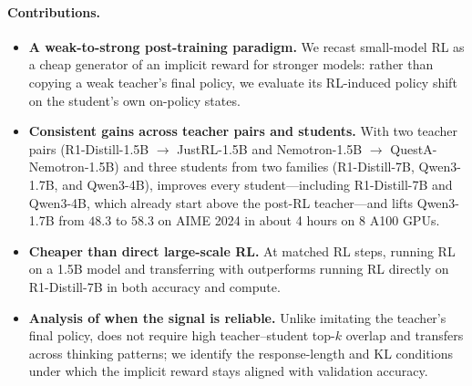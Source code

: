 \paragraph{Contributions.}
\begin{itemize}
    \item \textbf{A weak-to-strong post-training paradigm.} We recast small-model RL as a cheap generator of an implicit reward for stronger models: rather than copying a weak teacher's final policy, we evaluate its RL-induced policy shift on the student's own on-policy states.
    \item \textbf{Consistent gains across teacher pairs and students.} With
    two teacher pairs (R1-Distill-1.5B $\rightarrow$ JustRL-1.5B and
    Nemotron-1.5B $\rightarrow$ QuestA-Nemotron-1.5B) and three students from
    two families (R1-Distill-7B, Qwen3-1.7B, and Qwen3-4B), \method{} improves every
    student---including R1-Distill-7B and Qwen3-4B, which already start above the
    post-RL teacher---and lifts Qwen3-1.7B from $48.3$ to $58.3$ on AIME 2024 in
    about 4 hours on 8 A100 GPUs. 
    \item \textbf{Cheaper than direct large-scale RL.} At matched RL steps,
    running RL on a 1.5B model and transferring with \method{} outperforms
    running RL directly on R1-Distill-7B in both accuracy and compute.
    \item \textbf{Analysis of when the signal is reliable.} Unlike imitating the
    teacher's final policy, \method{} does not require high teacher--student
    top-$k$ overlap and transfers
    across thinking patterns; we identify the response-length and KL conditions
    under which the implicit reward stays aligned with validation accuracy.
\end{itemize}
